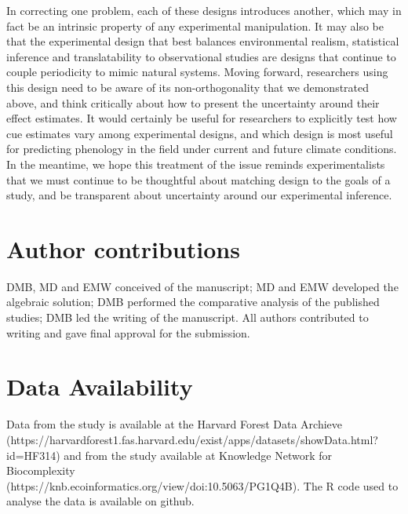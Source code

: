 \documentclass[11pt]{article}
\begin{document}
In correcting one problem, each of these designs introduces another, which may in fact be an intrinsic property of any experimental manipulation.
 It may also be that the experimental design that best balances environmental realism, statistical inference and translatability to observational studies are designs that continue to couple periodicity to mimic natural systems. Moving forward, researchers using this design need to be aware of its  non-orthogonality that we demonstrated above, and think critically about how to present the uncertainty around their effect estimates. It would certainly be useful for researchers to explicitly test how cue estimates vary among experimental designs, and which design is most useful for predicting phenology in the field under current and future climate conditions. In the meantime, we hope this treatment of the issue reminds experimentalists that we must continue to be thoughtful about matching design to the goals of a study, and be transparent about uncertainty around our experimental inference.

\section*{Author contributions}
DMB, MD and EMW conceived of the manuscript; MD and EMW developed the algebraic solution; DMB performed the comparative analysis of the published studies; DMB led the writing of the manuscript. All authors contributed to writing and gave final approval for the submission.

\section*{Data Availability}
Data from the \cite{Flynn2018} study is available at the Harvard Forest Data Archieve (https://harvardforest1.fas.harvard.edu/exist/apps/datasets/showData.html?id=HF314) and from the \citet{Buonaiuto:2021ug} study available at Knowledge Network for Biocomplexity\\ (https://knb.ecoinformatics.org/view/doi:10.5063/PG1Q4B). The R code used to analyse the data is available on github.


\end{document}
